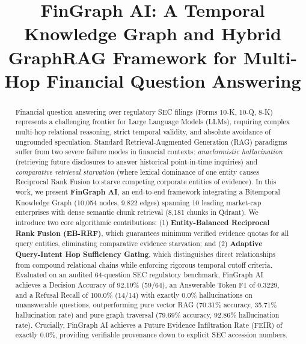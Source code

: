 \documentclass[conference]{IEEEtran}
\begin{document}
\title{FinGraph AI: A Temporal Knowledge Graph and Hybrid GraphRAG Framework for Multi-Hop Financial Question Answering}

\author{
}

\maketitle

\begin{abstract}
Financial question answering over regulatory SEC filings (Forms 10-K, 10-Q, 8-K) represents a challenging frontier for Large Language Models (LLMs), requiring complex multi-hop relational reasoning, strict temporal validity, and absolute avoidance of ungrounded speculation. Standard Retrieval-Augmented Generation (RAG) paradigms suffer from two severe failure modes in financial contexts: \textit{anachronistic hallucination} (retrieving future disclosures to answer historical point-in-time inquiries) and \textit{comparative retrieval starvation} (where lexical dominance of one entity causes Reciprocal Rank Fusion to starve competing corporate entities of evidence). In this work, we present \textbf{FinGraph AI}, an end-to-end framework integrating a Bitemporal Knowledge Graph (10,054 nodes, 9,822 edges) spanning 10 leading market-cap enterprises with dense semantic chunk retrieval (8,181 chunks in Qdrant). We introduce two core algorithmic contributions: (1) \textbf{Entity-Balanced Reciprocal Rank Fusion (EB-RRF)}, which guarantees minimum verified evidence quotas for all query entities, eliminating comparative evidence starvation; and (2) \textbf{Adaptive Query-Intent Hop Sufficiency Gating}, which distinguishes direct relationships from compound relational chains while enforcing rigorous temporal cutoff criteria. Evaluated on an audited 64-question SEC regulatory benchmark, FinGraph AI achieves a Decision Accuracy of 92.19\% (59/64), an Answerable Token F1 of 0.3229, and a Refusal Recall of 100.0\% (14/14) with exactly 0.0\% hallucinations on unanswerable questions, outperforming pure vector RAG (70.31\% accuracy, 35.71\% hallucination rate) and pure graph traversal (79.69\% accuracy, 92.86\% hallucination rate). Crucially, FinGraph AI achieves a Future Evidence Infiltration Rate (FEIR) of exactly 0.0\%, providing verifiable provenance down to explicit SEC accession numbers.
\end{abstract}
\end{document}
